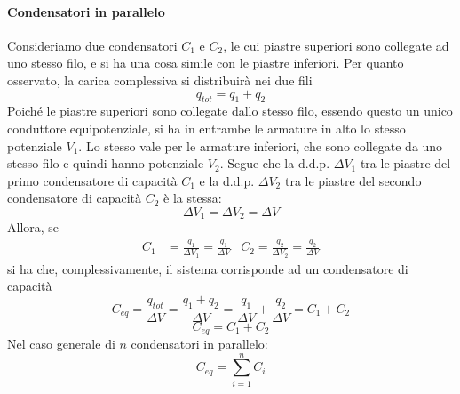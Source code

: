\paragraph{Condensatori in parallelo}
Consideriamo due condensatori $C_1$ e $C_2$, le cui piastre superiori sono collegate ad uno stesso filo, e si ha una cosa simile con le piastre inferiori.
Per quanto osservato, la carica complessiva si distribuirà nei due fili
\begin{equation*}
	q_{tot}=q_1+q_2
\end{equation*}
Poiché le piastre superiori sono collegate dallo stesso filo, essendo questo un unico conduttore equipotenziale, si ha in entrambe le armature in alto lo stesso potenziale $V_1$. Lo stesso vale per le armature inferiori, che sono collegate da uno stesso filo e quindi hanno potenziale $V_2$. Segue che la $\mathrm{d.d.p.}$ $\Delta V_1$ tra le piastre del primo condensatore di capacità $C_1$ e la $\mathrm{d.d.p.}$ $\Delta V_2$ tra le piastre del secondo condensatore di capacità $C_2$ è la stessa:
\begin{equation*}
	\Delta V_1=\Delta V_2=\Delta V
\end{equation*}
Allora, se
\begin{align*}
	C_1&=\frac{q_1}{\Delta V_1}=\frac{q_1}{\Delta V} & C_2=\frac{q_2}{\Delta V_2}=\frac{q_2}{\Delta V}
\end{align*}
si ha che, complessivamente, il sistema corrisponde ad un condensatore di capacità
\begin{equation*}
	C_{eq}=\frac{q_{tot}}{\Delta V}=\frac{q_1+q_2}{\Delta V}=\frac{q_1}{\Delta V}+\frac{q_2}{\Delta V}=C_1+C_2
\end{equation*}
\begin{equation}
	C_{eq}=C_1+C_2
\end{equation}
Nel caso generale di $n$ condensatori in parallelo:
\begin{equation}
	C_{eq}=\sum_{i=1}^{n}C_i
\end{equation}
